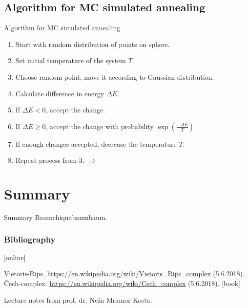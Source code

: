 \documentclass{beamer}
\begin{document}
\subsection{Algorithm for MC simulated annealing}
\begin{frame}{Algorithm for MC simulated annealing}
\begin{enumerate}
	\item {Start with random distribution of points on sphere.}
	\item {Set initial temperature of the system $T$.}
	\item {Choose random point, move it according to Gaussian distribution.}
	\item {Calculate difference in energy $\Delta E$.}
	\item {If $\Delta E < 0$, accept the change.} 
	\item {If $\Delta E \geq 0$, accept the change with probability $\exp(\frac{-\Delta E}{T})$}
	\item {If enough changes accepted, decrease the temperature $T$.}
	\item {Repeat process from 3. $\longrightarrow$}
\end{enumerate}

\end{frame}

\section*{Summary}

\begin{frame}{Summary}
 Baumchiquabaumbaum.
\end{frame}





\begin{frame}
  \frametitle<presentation>{Bibliography}
    
  \begin{thebibliography}{99}

  [online]
  	 
  Vietoris-Rips. \url{https://en.wikipedia.org/wiki/Vietoris_Rips_complex} (5.6.2018).
  Čech-complex. \url{https://en.wikipedia.org/wiki/Cech_complex} (5.6.2018).
  [book]
 	
   Lecture notes from prof. dr. Neža Mramor Kosta.
  \end{thebibliography}
\end{frame}
\end{document}
